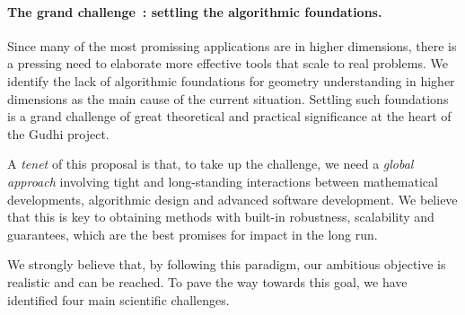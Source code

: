 \paragraph{The grand challenge~: settling the algorithmic foundations.}



Since many of the most promissing applications are in higher dimensions, there is a pressing need to elaborate more effective tools that scale to real problems.  We identify the lack of  algorithmic foundations for geometry understanding in higher dimensions as %
the main cause of the current situation.  Settling such foundations
is a grand challenge of great theoretical and practical significance at the heart of the Gudhi project.


A {\em tenet} of this proposal is that, to take up the challenge, we need a {\em global approach} involving tight and long-standing interactions between mathematical developments, algorithmic design and advanced software development. We believe that this is key to obtaining methods with built-in robustness, scalability and guarantees, which are the best promises for impact in the long run.

We strongly believe that, by following this paradigm,  our ambitious objective is realistic and can be reached. To pave the way towards this goal, we have identified  four main scientific challenges.




